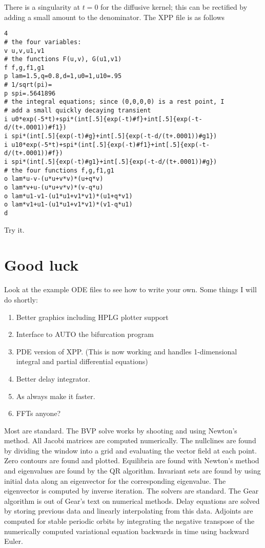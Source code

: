 There is a singularity at $t=0$ for the diffusive kernel; this can be
rectified by adding a small amount to the denominator. 
The XPP file is as follows
\begin{verbatim}
4
# the four variables:   
v u,v,u1,v1
# the functions F(u,v), G(u1,v1)
f f,g,f1,g1
p lam=1.5,q=0.8,d=1,u0=1,u10=.95
# 1/sqrt(pi)=
p spi=.5641896
# the integral equations; since (0,0,0,0) is a rest point, I
# add a small quickly decaying transient
i u0*exp(-5*t)+spi*(int[.5]{exp(-t)#f}+int[.5]{exp(-t-d/(t+.0001))#f1})
i spi*(int[.5]{exp(-t)#g}+int[.5]{exp(-t-d/(t+.0001))#g1})
i u10*exp(-5*t)+spi*(int[.5]{exp(-t)#f1}+int[.5]{exp(-t-d/(t+.0001))#f})
i spi*(int[.5]{exp(-t)#g1}+int[.5]{exp(-t-d/(t+.0001))#g})
# the four functions f,g,f1,g1
o lam*u-v-(u*u+v*v)*(u+q*v)
o lam*v+u-(u*u+v*v)*(v-q*u)
o lam*u1-v1-(u1*u1+v1*v1)*(u1+q*v1)
o lam*v1+u1-(u1*u1+v1*v1)*(v1-q*u1)
d
\end{verbatim}

Try it.


\section{Good luck}
Look at the example ODE files to see how to write your own. Some
things I will do shortly:
\begin{enumerate}
\item Better graphics including HPLG plotter support
\item Interface to AUTO the bifurcation program
\item PDE version of XPP. (This is now working and handles
1-dimensional integral and partial differential equations)
\item Better delay integrator.
\item As always make it faster.
\item FFTs anyone?
\end{enumerate}


  Most are standard.  
The BVP solve works 
by shooting and using Newton's method.  All Jacobi matrices are computed 
numerically.  The nullclines are found by dividing the window into a grid and 
evaluating the vector field at each point.  Zero contours are found and plotted. 
Equilibria are found with Newton's method and eigenvalues are found by the QR
 algorithm.  Invariant sets are found by using initial data along an eigenvector
 for the corresponding eigenvalue.  The eigenvector is computed by inverse 
iteration.  The solvers are standard.  The Gear algorithm is out of Gear's text 
on numerical methods.  Delay equations are solved by storing previous data and 
linearly interpolating from this data.  Adjoints are computed for stable periodic
 orbits by integrating the negative transpose of the numerically computed
 variational equation backwards in time using backward Euler.

